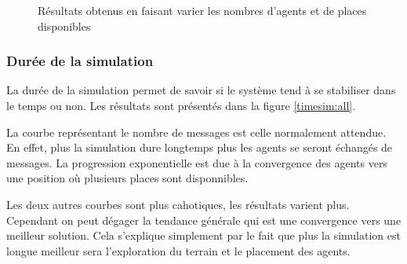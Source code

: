 \begin{figure}
\begin{center}
  \end{center}

  \caption{Résultats obtenus en faisant varier les nombres d'agents et de places disponibles}
  \label{nbagents:all}
\end{figure}

\subsubsection{Durée de la simulation}

La durée de la simulation permet de savoir si le système tend à se stabiliser dans le temps ou non.
Les résultats sont présentés dans la figure \ref{timesim:all}.

La courbe représentant le nombre de messages est celle normalement attendue. En effet, plus la simulation dure longtemps plus les agents se seront échangés de messages. La progression exponentielle est due à la convergence des agents vers une position où plusieurs places sont disponnibles.

Les deux autres courbes sont plus cahotiques, les résultats varient plus. Cependant on peut dégager la tendance générale qui est une convergence vers une meilleur solution. Cela s'explique simplement par le fait que plus la simulation est longue meilleur sera l'exploration du terrain et le placement des agents.

